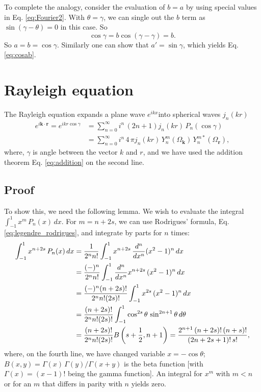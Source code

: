 \documentclass[11pt]{article}
\newcommand{\vct}[1]{\boldsymbol{\mathbf{#1}}}
\newcommand{\vr}{\vct{r}}
\newcommand{\vk}{\vct{k}}
\begin{document}
To complete the analogy,
consider the evaluation of $b = a$
by using special values in
Eq. \eqref{eq:Fourier2}.
%
With $\theta = \gamma$,
we can single out the $b$ term
as $\sin(\gamma - \theta) = 0$
in this case.
%
So
\begin{equation}
  \cos\gamma
=
  b \cos(\gamma - \gamma)
= b.
\end{equation}
So $a = b = \cos\gamma$.
%
Similarly one can show that $a' = \sin\gamma$,
which yields Eq. \eqref{eq:cosab}.



\section{Rayleigh equation}



The Rayleigh equation expands a plane wave $e^{i k x}$into spherical waves $j_n(kr)$
\begin{align}
  e^{i\vk \cdot \vr}
=
  e^{ikr\cos\gamma}
&=
  \sum_{n = 0}^\infty
i^n \, ( 2 n + 1 )
j_n(k r) \, P_n(\cos\gamma)
\label{eq:rayleigh} \\
&=
  \sum_{n = 0}^\infty
i^n \, 4 \, \pi
j_n(k r) \, Y_n^m(\Omega_{\vk}) \, Y_n^{m*}(\Omega_{\vr}),
\label{eq:rayleigh_yy}
\end{align}
where, $\gamma$ is angle between the vector $k$ and $r$,
and we have used the addition theorem Eq. \eqref{eq:addition}
on the second line.



\subsection{Proof}



To show this, we need the following lemma.
%
We wish to evaluate the integral
$\int_{-1}^1 x^m \, P_n(x) \, dx$.
%
For $m = n + 2 s$, we can use
Rodrigues' formula, Eq. \eqref{eq:legendre_rodrigues},
and integrate by parts for $n$ times:
\begin{align*}
\int_{-1}^1 x^{n + 2s} \, P_n(x) \, dx
&=
\frac{ 1 } { 2^n n! }
\int_{-1}^1 x^{n + 2 s} \,
\frac{d^n}{dx^n} (x^2 - 1)^n \, dx
\notag \\
&=
\frac{ (-)^n } { 2^n n! }
\int_{-1}^1 \frac{d^n}{dx^n} x^{n + 2 s} \,
(x^2 - 1)^n \, dx
\notag \\
&=
\frac{ (-)^n (n + 2 s)! } { 2^n n! (2 s)! }
\int_{-1}^1 x^{2 s} \,
(x^2 - 1)^n \, dx
\notag \\
&=
\frac{ (n + 2 s)! } { 2^n n! (2 s)! }
\int_{-1}^1 \cos^{2 s}\theta \,
\sin^{2n + 1}\theta \, d\theta
\notag \\
&=
\frac{ (n + 2 s)! } { 2^n n! (2 s)! }
B\left(s + \frac{1}{2}, n + 1\right)
=
\frac{ 2^{n+1} \, (n + 2 s)! \, (n + s)! } { (2 n + 2 s + 1)! \, s! },
\notag \\
\end{align*}
where,
on the fourth line,
we have changed variable $x = -\cos\theta$;
%
$B(x, y) = \Gamma(x) \, \Gamma(y) / \Gamma(x + y)$
is the beta function
[with $\Gamma(x) = (x-1)!$ being the gamma function].
%
An integral for $x^m$ with $m < n$
or for an $m$ that differs in parity with $n$
yields zero.
\end{document}
